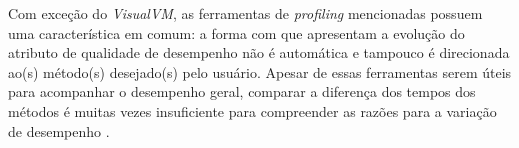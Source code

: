 

Com exceção do \textit{VisualVM}, as ferramentas de \textit{profiling} mencionadas possuem uma característica em comum: a forma com que apresentam a evolução do atributo de qualidade de desempenho não é automática e tampouco é direcionada ao(s) método(s) desejado(s) pelo usuário. Apesar de essas ferramentas serem úteis para acompanhar o desempenho geral, comparar a diferença dos tempos dos métodos é muitas vezes insuficiente para compreender as razões para a variação de desempenho \cite{SandovalAlcocer2013}.

